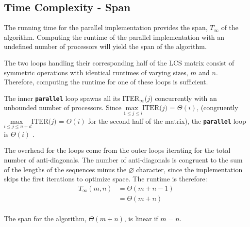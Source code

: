 \documentclass[usletter, 11pt]{extarticle}
\begin{document}
        \subsection{Time Complexity - Span} The running time for the parallel
        implementation provides the span, $T_{\infty}$ of the algorithm.
        Computing the runtime of the parallel implementation with an undefined
        number of processors will yield the span of the algorithm.

        The two loops handling their corresponding half of the LCS matrix
        consist of symmetric operations with identical runtimes of varying
        sizes, $m$ and $n$. Therefore, computing the runtime for one of these
        loops is sufficient.

        The inner \texttt{\textbf{parallel}} loop spawns all its
        ITER$_\infty$($j$) concurrently with an unbounded number of processors.
        Since $\underset{1 \le j \le i}{\text{max }}\text{ITER($j$)}$ =
        $\Theta(i)$, (congruently $\underset{i \le j \le n+d}{\text{max
        }}\text{ITER($j$)}$ = $\Theta(i)$ for the second half of the matrix),
        the \texttt{\textbf{parallel}} loop is $\Theta(i)$ \cite{Huang1989}.

        The overhead for the loops come from the outer loops iterating for the
        total number of anti-diagonals. The number of anti-diagonals is
        congruent to the sum of the lengths of the sequences minus the
        $\varnothing$ character, since the implementation skips the first
        iterations to optimize space. The runtime is therefore:
        \begin{equation*}
            \begin{split}
                T_\infty(m, n) & = \Theta(m+n-1) \\
                & = \Theta(m+n) \\
            \end{split}
        \end{equation*}

        The span for the algorithm, $\Theta(m+n)$, is linear if $m = n$.
\end{document}
